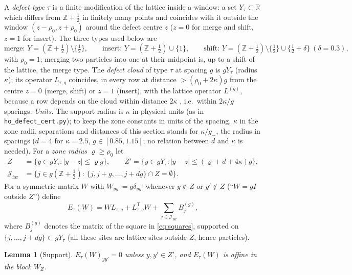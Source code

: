 \documentclass[11pt,a4paper]{article}
\theoremstyle{plain}
\newtheorem{lemma}[theorem]{Lemma}
\theoremstyle{definition}
\theoremstyle{remark}
\numberwithin{equation}{section}
\newcommand{\R}{\mathbb{R}}
\newcommand{\Z}{\mathbb{Z}}
\newcommand{\A}[1]{\cite[#1]{Addendum}}
\begin{document}
A \emph{defect type} $\tau$ is a finite modification of the lattice inside a window: a set $Y_\tau\subset\R$ which differs from $\Z+\frac12$ in finitely many points and coincides with it outside the window $(z-\rho_0,z+\rho_0)$ around the defect centre $z$ ($z=0$ for merge and shift, $z=1$ for insert). The three types used below are
\[
\text{merge: }Y=(\Z+\tfrac12)\setminus\{\tfrac12\},\qquad
\text{insert: }Y=(\Z+\tfrac12)\cup\{1\},\qquad
\text{shift: }Y=(\Z+\tfrac12)\setminus\{\tfrac12\}\cup\{\tfrac12+\delta\}\ (\delta=0.3),
\]
with $\rho_0=1$; merging two particles into one at their midpoint is, up to a shift of the lattice, the merge type. The \emph{defect cloud} of type $\tau$ at spacing $g$ is $gY_\tau$ (radius $\kappa$); its operator $L_{\tau,g}$ coincides, in every row at distance $>(\rho_0+2\kappa)g$ from the centre $z=0$ (merge, shift) or $z=1$ (insert), with the lattice operator $L^{(g)}$, because a row depends on the cloud within distance $2\kappa$ \A{(4.4)}, i.e.\ within $2\kappa/g$ spacings. \emph{Units.} The support radius is $\kappa$ in physical units (as in \texttt{ho\_defect\_cert.py}); to keep the zone constants in units of the spacing, $\kappa$ in the zone radii, separations and distances of this section stands for $\kappa/g_-$, the radius in spacings ($d=4$ for $\kappa=2.5$, $g\in[0.85,1.15]$; no relation between $d$ and $\kappa$ is needed). For a \emph{zone radius} $\varrho\ge\rho_0$ let
\begin{equation}\label{eq:zones}
\begin{aligned}
Z&=\{y\in gY_\tau:|y-z|\le\varrho g\},\qquad
Z'=\{y\in gY_\tau:|y-z|\le(\varrho+d+4\kappa)g\},\\
\mathcal J_{\mathrm{far}}&=\{j\in g(\Z+\tfrac12):\ \{j,j+g,\dots,j+dg\}\cap Z=\emptyset\}.
\end{aligned}
\end{equation}
For a symmetric matrix $W$ with $W_{yy'}=g\delta_{yy'}$ whenever $y\notin Z$ or $y'\notin Z$ (``$W=gI$ outside $Z$'') define
\begin{equation}\label{eq:E}
E_\tau(W)=WL_{\tau,g}+L_{\tau,g}^{\mathsf T}W+\sum_{j\in\mathcal J_{\mathrm{far}}}B^{(g)}_j ,
\end{equation}
where $B_j^{(g)}$ denotes the matrix of the square in \eqref{eq:squares}, supported on $\{j,\dots,j+dg\}\subset gY_\tau$ (all these sites are lattice sites outside $Z$, hence particles).

\begin{lemma}[Support]\label{lem:support}
$E_\tau(W)_{yy'}=0$ unless $y,y'\in Z'$, and $E_\tau(W)$ is affine in the block $W_Z$.
\end{lemma}
\end{document}
